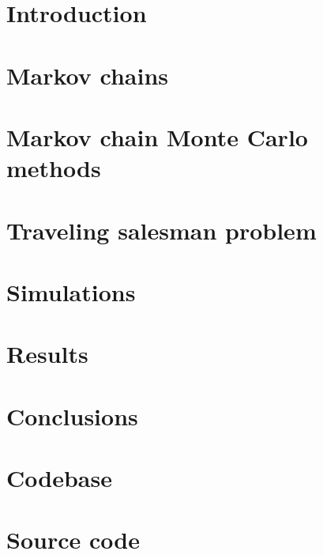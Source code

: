 




	
	\newpage
	
	
	\newpage
	
	\tableofcontents
	\listoftables
	\listoffigures
	\clearpage
	
	\section{Introduction}
		
	
	\section{Markov chains}
		
	
	\section{Markov chain Monte Carlo methods}
		
	
	\section{Traveling salesman problem}
		
	
	\section{Simulations}
		
	
	\section{Results}
	
	\section{Conclusions}
	
	\section{Codebase}
	
	\clearpage
	\nocite{*}
	
	
	
	
	
	\appendix
	\clearpage
	\section{Source code} \label{apsec:code}
	\clearpage
	
	
